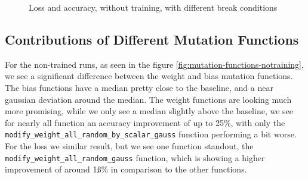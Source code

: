 \begin{figure}
\begin{subfigure}{0.5\textwidth}
    \end{subfigure}
    \caption{Loss and accuracy, without training, with different break conditions}
    \label{fig:break-conditions-notraining}
\end{figure}
\subsection{Contributions of Different Mutation Functions}\label{subsec:contributions-of-different-mutation-functions}
For the non-trained runs, as seen in the figure \ref{fig:mutation-functions-notraining}, we see a significant difference between the weight and bias mutation functions.
The bias functions have a median pretty close to the baseline, and a near gaussian deviation around the median.
The weight functions are looking much more promising, while we only see a median slightly above the baseline, we see for nearly all function an accuracy improvement of up to 25\%, with only the \texttt{modify\_weight\_all\_random\_by\_scalar\_gauss} function performing a bit worse.
For the loss we similar result, but we see one function standout, the \texttt{modify\_weight\_all\_random\_gauss} function, which is showing a higher improvement of around 1ß\% in comparison to the other functions.
